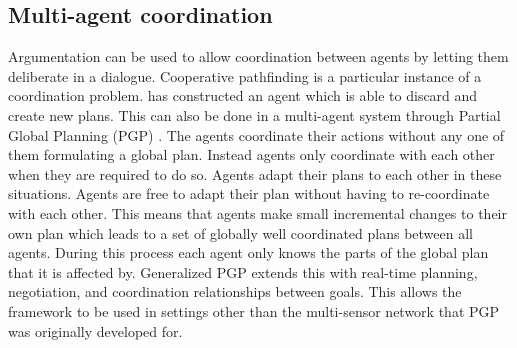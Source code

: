 \subsection{Multi-agent coordination}
Argumentation can be used to allow coordination between agents by letting them
deliberate in a dialogue. Cooperative pathfinding is a particular instance of a
coordination problem. \cite{pollock1995} has constructed an agent which is able
to discard and create new plans. This can also be done in a multi-agent system
through Partial Global Planning (PGP)
\citep[pp.~202--204]{durfee1991,decker1992,woodridge2009}. The agents
coordinate their actions without any one of them formulating a global plan.
Instead agents only coordinate with each other when they are required to do so.
Agents adapt their plans to each other in these situations. Agents are free to
adapt their plan without having to re-coordinate with each other. This means
that agents make small incremental changes to their own plan which leads to a
set of globally well coordinated plans between all agents. During this process
each agent only knows the parts of the global plan that it is affected by.
Generalized PGP \citep{decker1992} extends this with real-time planning,
negotiation, and coordination relationships between goals. This allows the
framework to be used in settings other than the multi-sensor network that PGP
was originally developed for.